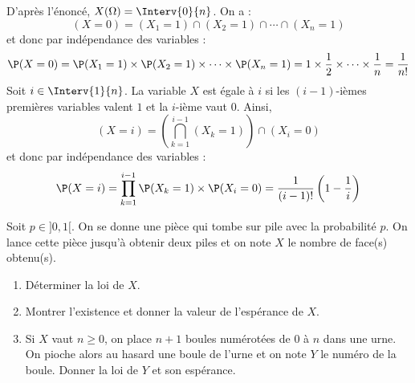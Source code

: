 \documentclass[a4paper,10pt]{report}
\begin{document}
\corr  D'après l'énoncé, $X(\Omega) = \Interv{0}{n}$. On a :
$$ (X=0)= (X_1=1) \cap (X_2=1) \cap \cdots \cap (X_n=1)$$
et donc par indépendance des variables :
$$ \P(X=0) = \P(X_1=1) \times \P(X_2=1) \times \cdots \times \P(X_n=1) = 1 \times \dfrac{1}{2} \times \cdots \times \dfrac{1}{n} = \dfrac{1}{n!} $$
Soit $i \in \Interv{1}{n}$. La variable $X$ est égale à $i$ si les $(i-1)$-ièmes premières variables valent $1$ et la $i$-ième vaut $0$. Ainsi,
$$(X=i) = \left(\bigcap_{k=1}^{i-1} (X_k=1)\right) \cap (X_i=0)$$
et donc par indépendance des variables :
$$ \P(X=i) = \prod_{k=1}^{i-1} \P(X_k=1) \times \P(X_i=0) = \dfrac{1}{(i-1)!} \left(1 - \dfrac{1}{i}\right)$$

\begin{Exa} Soit $p \in ]0,1[$. On se donne une pièce qui tombe sur pile avec la probabilité $p$. On lance cette pièce jusqu'à obtenir deux piles et on note $X$ le nombre de face(s) obtenu(s).

\begin{enumerate}
\item Déterminer la loi de $X$.
\item Montrer l'existence et donner la valeur de l'espérance de $X$.
\item Si $X$ vaut $n \geq 0$, on place $n+1$ boules numérotées de $0$ à $n$ dans une urne. On pioche alors au hasard une boule de l'urne et on note $Y$ le numéro de la boule. Donner la loi de $Y$ et son espérance.
\end{enumerate}   
\end{Exa}
\end{document}
